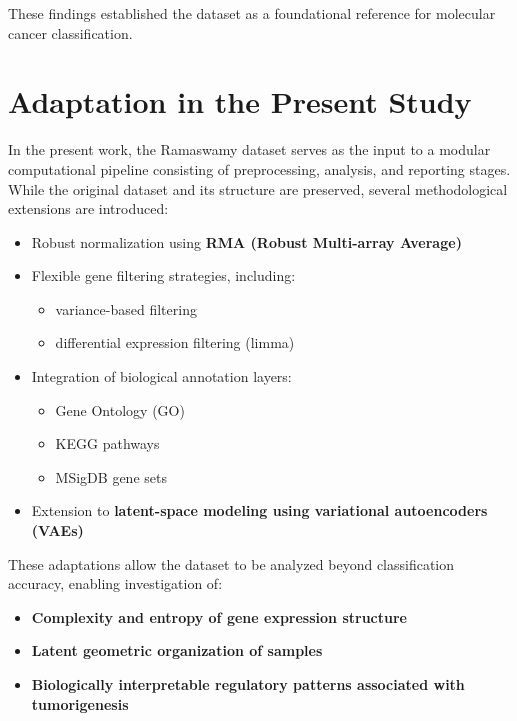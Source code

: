 \documentclass[
  letterpaper,
  DIV=11,
  numbers=noendperiod,
  openany,
  oneside]{scrreprt}
\providecommand{\tightlist}{%
  \setlength{\itemsep}{0pt}\setlength{\parskip}{0pt}}
\begin{document}
These findings established the dataset as a foundational reference for
molecular cancer classification.

\section{Adaptation in the Present
Study}\label{adaptation-in-the-present-study}

In the present work, the Ramaswamy dataset serves as the input to a
modular computational pipeline consisting of preprocessing, analysis,
and reporting stages. While the original dataset and its structure are
preserved, several methodological extensions are introduced:

\begin{itemize}
\tightlist
\item
  Robust normalization using \textbf{RMA (Robust Multi-array Average)}\\
\item
  Flexible gene filtering strategies, including:

  \begin{itemize}
  \tightlist
  \item
    variance-based filtering\\
  \item
    differential expression filtering (limma)\\
  \end{itemize}
\item
  Integration of biological annotation layers:

  \begin{itemize}
  \tightlist
  \item
    Gene Ontology (GO)\\
  \item
    KEGG pathways\\
  \item
    MSigDB gene sets\\
  \end{itemize}
\item
  Extension to \textbf{latent-space modeling using variational
  autoencoders (VAEs)}
\end{itemize}

These adaptations allow the dataset to be analyzed beyond classification
accuracy, enabling investigation of:

\begin{itemize}
\tightlist
\item
  \textbf{Complexity and entropy of gene expression structure}\\
\item
  \textbf{Latent geometric organization of samples}\\
\item
  \textbf{Biologically interpretable regulatory patterns associated with
  tumorigenesis}
\end{itemize}
\end{document}
